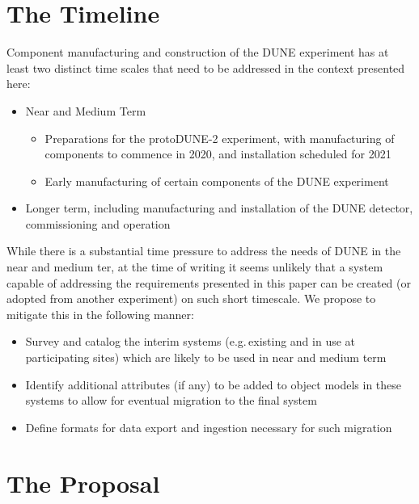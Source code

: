 \documentclass[pdftex,12pt,letter]{article}
\begin{document}
\section{The Timeline}
Component manufacturing and construction of the DUNE experiment has at least two distinct time
scales that need to be addressed in the context presented here:

\begin{itemize}

\item Near and Medium Term
\begin{itemize}

\item Preparations for the protoDUNE-2 experiment, with manufacturing of components to commence in 2020, and installation scheduled for 2021
\item Early manufacturing of certain components of the DUNE experiment
\end{itemize}

\item Longer term, including manufacturing and installation of the DUNE detector, commissioning and operation
\end{itemize}

\noindent While there is a substantial time pressure to address the needs of DUNE in the near and medium ter,
at the time of writing it seems unlikely that a system capable of addressing the requirements
presented in this paper can be created (or adopted from another experiment) on such short timescale.
We propose to mitigate this in the following manner:

\begin{itemize}

\item Survey and catalog the interim systems (e.g.\,existing and in use at participating sites)
which are likely to be used in near and medium term

\item Identify additional attributes (if any) to be added to object models in these systems to allow
for eventual migration to the final system

\item Define formats for data export and ingestion necessary for such migration

\end{itemize}

\section{The Proposal}
\end{document}
